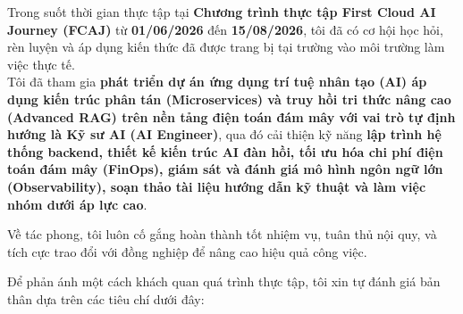 Trong suốt thời gian thực tập tại \textbf{Chương trình thực tập First
Cloud AI Journey (FCAJ)} từ \textbf{01/06/2026} đến \textbf{15/08/2026},
tôi đã có cơ hội học hỏi, rèn luyện và áp dụng kiến thức đã được trang
bị tại trường vào môi trường làm việc thực tế.\\
Tôi đã tham gia \textbf{phát triển dự án ứng dụng trí tuệ nhân tạo (AI)
áp dụng kiến trúc phân tán (Microservices) và truy hồi tri thức nâng cao
(Advanced RAG) trên nền tảng điện toán đám mây với vai trò tự định hướng
là Kỹ sư AI (AI Engineer)}, qua đó cải thiện kỹ năng \textbf{lập trình
hệ thống backend, thiết kế kiến trúc AI đàn hồi, tối ưu hóa chi phí điện
toán đám mây (FinOps), giám sát và đánh giá mô hình ngôn ngữ lớn
(Observability), soạn thảo tài liệu hướng dẫn kỹ thuật và làm việc nhóm
dưới áp lực cao}.

Về tác phong, tôi luôn cố gắng hoàn thành tốt nhiệm vụ, tuân thủ nội
quy, và tích cực trao đổi với đồng nghiệp để nâng cao hiệu quả công
việc.

Để phản ánh một cách khách quan quá trình thực tập, tôi xin tự đánh giá
bản thân dựa trên các tiêu chí dưới đây:

